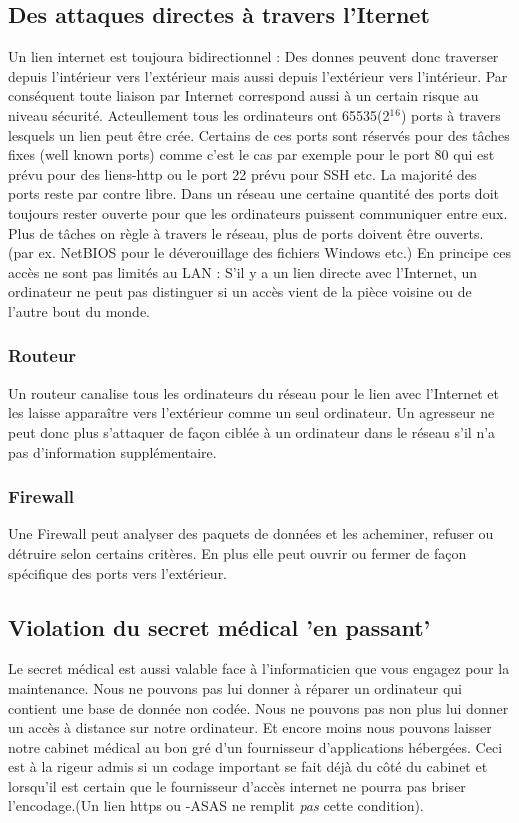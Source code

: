 \documentclass[a4paper]{scrartcl}
\begin{document}
\subsection{Des attaques directes à travers l'Iternet}
Un lien internet est toujoura bidirectionnel : Des donnes peuvent donc traverser depuis l'intérieur vers l'extérieur mais aussi depuis l'extérieur vers l'intérieur. Par conséquent toute liaison par Internet correspond aussi à un certain risque au niveau sécurité. Acteullement tous les ordinateurs ont 65535(2$^1$$^6$) ports à travers lesquels un lien peut être crée. Certains de ces ports sont réservés pour des tâches fixes (well known ports) comme c'est le cas par exemple pour le port 80 qui est prévu pour des liens-http ou le port 22 prévu pour SSH etc. La majorité des ports reste par contre libre. Dans un réseau une certaine quantité des ports doit toujours rester ouverte pour que les ordinateurs puissent communiquer entre eux. Plus de tâches on règle à travers le réseau, plus de ports doivent être ouverts. (par ex. NetBIOS pour le déverouillage des fichiers Windows etc.) En principe ces accès ne sont pas limités au LAN : S'il y a un lien directe avec l'Internet, un ordinateur ne peut pas distinguer si un accès vient de la pièce voisine ou de l'autre bout du monde.

\subsubsection{Routeur}
Un routeur canalise tous les ordinateurs du réseau pour le lien avec l'Internet et les laisse apparaître vers l'extérieur comme un seul ordinateur. Un agresseur ne peut donc plus s'attaquer de façon ciblée à un ordinateur dans le réseau s'il n'a pas d'information supplémentaire.

\subsubsection{Firewall}
 Une Firewall peut analyser des paquets de données et les acheminer, refuser ou détruire selon certains critères. En plus elle peut ouvrir ou fermer de façon spécifique des ports vers l'extérieur.

\subsection{Violation du secret médical 'en passant'}
Le secret médical est aussi valable face à l'informaticien que vous engagez pour la maintenance. Nous ne pouvons pas lui donner à réparer un ordinateur qui contient une base de donnée non codée. Nous ne pouvons pas non plus lui donner un accès à distance sur notre ordinateur. Et encore moins nous pouvons laisser notre cabinet médical au bon gré d'un fournisseur d'applications hébergées. Ceci est à la rigeur admis si un codage important se fait déjà du côté du cabinet et lorsqu'il est certain que le fournisseur d'accès internet ne pourra pas briser l'encodage.(Un lien https ou -ASAS ne remplit \textit{pas} cette condition).
\end{document}
